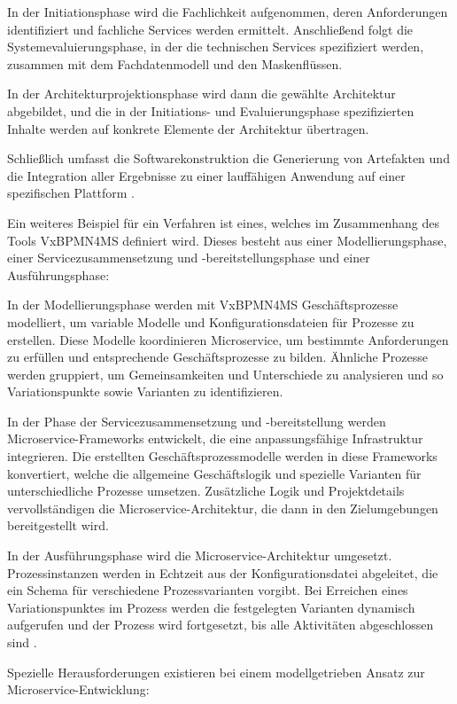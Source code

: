 {In der Initiationsphase wird die Fachlichkeit aufgenommen, deren Anforderungen identifiziert und fachliche Services werden ermittelt. Anschließend folgt die Systemevaluierungsphase, in der die technischen Services spezifiziert werden, zusammen mit dem Fachdatenmodell und den Maskenflüssen.

In der Architekturprojektionsphase wird dann die gewählte Architektur abgebildet, und die in der Initiations- und Evaluierungsphase spezifizierten Inhalte werden auf konkrete Elemente der Architektur übertragen.

Schließlich umfasst die Softwarekonstruktion die Generierung von Artefakten und die Integration aller Ergebnisse zu einer lauffähigen Anwendung auf einer spezifischen Plattform \cite[S.62-66]{rempp}.

Ein weiteres Beispiel für ein Verfahren ist eines, welches im Zusammenhang des Tools VxBPMN4MS definiert wird. Dieses besteht aus einer Modellierungsphase, einer Servicezusammensetzung und -bereitstellungsphase und einer Ausführungsphase:

In der Modellierungsphase werden mit VxBPMN4MS Geschäftsprozesse modelliert, um variable Modelle und Konfigurationsdateien für Prozesse zu erstellen. Diese Modelle koordinieren Microservice, um bestimmte Anforderungen zu erfüllen und entsprechende Geschäftsprozesse zu bilden. Ähnliche Prozesse werden gruppiert, um Gemeinsamkeiten und Unterschiede zu analysieren und so Variationspunkte sowie Varianten zu identifizieren.

In der Phase der Servicezusammensetzung und -bereitstellung werden Microservice-Frameworks entwickelt, die eine anpassungsfähige Infrastruktur integrieren. Die erstellten Geschäftsprozessmodelle werden in diese Frameworks konvertiert, welche die allgemeine Geschäftslogik und spezielle Varianten für unterschiedliche Prozesse umsetzen. Zusätzliche Logik und Projektdetails vervollständigen die Microservice-Architektur, die dann in den Zielumgebungen bereitgestellt wird.

In der Ausführungsphase wird die Microservice-Architektur umgesetzt. Prozessinstanzen werden in Echtzeit aus der Konfigurationsdatei abgeleitet, die ein Schema für verschiedene Prozessvarianten vorgibt. Bei Erreichen eines Variationspunktes im Prozess werden die festgelegten Varianten dynamisch aufgerufen und der Prozess wird fortgesetzt, bis alle Aktivitäten abgeschlossen sind \cite{sun}.

Spezielle Herausforderungen existieren bei einem modellgetrieben Ansatz zur Microservice-Entwicklung:

}
